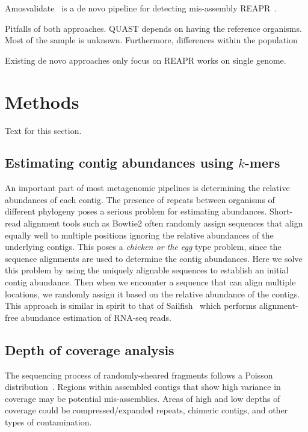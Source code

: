 Amosvalidate~\cite{amosvalidate2008} is a de novo pipeline for detecting mis-assembly
REAPR~\cite{hunt2013reapr}.

Pitfalls of both approaches.
QUAST depends on having the reference organisms.  Most of the sample is unknown.  Furthermore, differences within the population

Existing de novo approaches only focus on REAPR works on single genome.

\section{Methods}
Text for this section.

\subsection{Estimating contig abundances using $k$-mers}

An important part of most metagenomic pipelines is determining the relative abundances of each contig.
The presence of repeats between organisms of different phylogeny poses a serious problem for estimating abundances.
Short-read alignment tools such as Bowtie2 often randomly assign sequences that align equally well to multiple positions ignoring the relative abundances of the underlying contigs.
This poses a \emph{chicken or the egg} type problem, since the sequence alignments are used to determine the contig abundances.
Here we solve this problem by using the uniquely alignable sequences to establish an initial contig abundance.
Then when we encounter a sequence that can align multiple locations, we randomly assign it based on the relative abundance of the contigs.
This approach is similar in spirit to that of Sailfish~\cite{patro2014sailfish} which performs alignment-free abundance estimation of RNA-seq reads.


\subsection{Depth of coverage analysis}
The sequencing process of randomly-sheared fragments follows a Poisson distribution~\cite{lander1988genomic}.  Regions within assembled contigs that show high variance in coverage may be potential mis-assemblies.  Areas of high and low depths of coverage could be compressed/expanded repeats, chimeric contigs, and other types of contamination.


